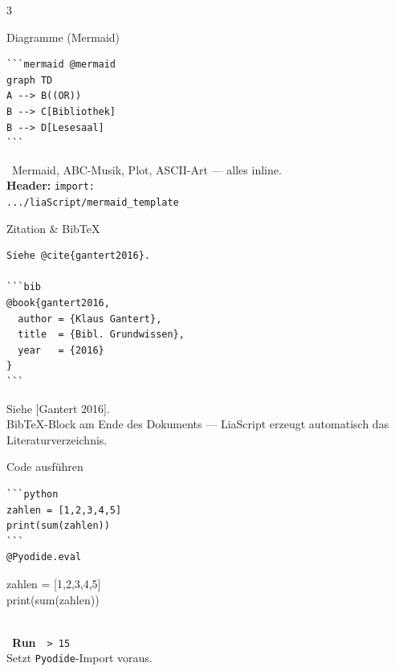 \documentclass[a4paper,landscape,9pt]{extarticle}
\newcommand{\prevsm}[1]{{\footnotesize\color{muted} #1}}
\begin{document}
\begin{multicols}{3}

\begin{liacard}{Diagramme (Mermaid)}
\begin{lstlisting}[language=lia]
```mermaid @mermaid
graph TD
A --> B((OR))
B --> C[Bibliothek]
B --> D[Lesesaal]
```
\end{lstlisting}
\tcblower
\prevsm{\faProjectDiagram~Mermaid, ABC-Musik,
Plot, ASCII-Art --- alles inline.\\[2pt]
{\footnotesize \textbf{Header:} \texttt{import:}\\
\texttt{.../liaScript/mermaid\_template}}}
\end{liacard}

\begin{liacard}{Zitation \& BibTeX}
\begin{lstlisting}[language=lia]
Siehe @cite{gantert2016}.

```bib
@book{gantert2016,
  author = {Klaus Gantert},
  title  = {Bibl. Grundwissen},
  year   = {2016}
}
```
\end{lstlisting}
\tcblower
\prevsm{Siehe \textcolor{liagreen}{[Gantert 2016]}.\\[3pt]
{\footnotesize BibTeX-Block am Ende des Dokuments —
LiaScript erzeugt automatisch das Literaturverzeichnis.}}
\end{liacard}

\begin{liacard}{Code ausführen}
\begin{lstlisting}[language=lia]
```python
zahlen = [1,2,3,4,5]
print(sum(zahlen))
```
@Pyodide.eval
\end{lstlisting}
\tcblower
\prevsm{\colorbox{codebg}{\parbox{0.85\linewidth}{\ttfamily\scriptsize zahlen = [1,2,3,4,5]\\print(sum(zahlen))}}\\[2pt]
\faPlay~\textbf{Run}~~\textcolor{liagreen}{\texttt{> 15}}\\[2pt]
{\footnotesize Setzt \texttt{Pyodide}-Import voraus.}}
\end{liacard}

\end{multicols}
\end{document}
